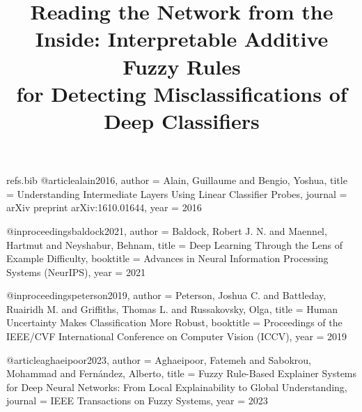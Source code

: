 \begin{filecontents*}[overwrite]{refs.bib}
@article{alain2016,
  author  = {Alain, Guillaume and Bengio, Yoshua},
  title   = {Understanding Intermediate Layers Using Linear Classifier Probes},
  journal = {arXiv preprint arXiv:1610.01644},
  year    = {2016}
}

@inproceedings{baldock2021,
  author    = {Baldock, Robert J. N. and Maennel, Hartmut and Neyshabur, Behnam},
  title     = {Deep Learning Through the Lens of Example Difficulty},
  booktitle = {Advances in Neural Information Processing Systems (NeurIPS)},
  year      = {2021}
}

@inproceedings{peterson2019,
  author    = {Peterson, Joshua C. and Battleday, Ruairidh M. and Griffiths, Thomas L. and Russakovsky, Olga},
  title     = {Human Uncertainty Makes Classification More Robust},
  booktitle = {Proceedings of the IEEE/CVF International Conference on Computer Vision (ICCV)},
  year      = {2019}
}

@article{aghaeipoor2023,
  author  = {Aghaeipoor, Fatemeh and Sabokrou, Mohammad and Fern{\'a}ndez, Alberto},
  title   = {Fuzzy Rule-Based Explainer Systems for Deep Neural Networks: From Local Explainability to Global Understanding},
  journal = {IEEE Transactions on Fuzzy Systems},
  year    = {2023}
}

\end{filecontents*}
\documentclass[conference,a4paper]{IEEEtran}
\IEEEoverridecommandlockouts

\usepackage{cite}
\usepackage{amsmath,amssymb,amsfonts}
\usepackage{graphicx}
\usepackage{booktabs,multirow}
\usepackage{textcomp}
\usepackage{xcolor}
\usepackage[hidelinks]{hyperref}

\newcommand{\todo}[1]{\textcolor{red}{[TODO: #1]}}
\newcommand{\term}[1]{\textsc{#1}}



\title{Reading the Network from the Inside: Interpretable Additive Fuzzy Rules\\
for Detecting Misclassifications of Deep Classifiers}

